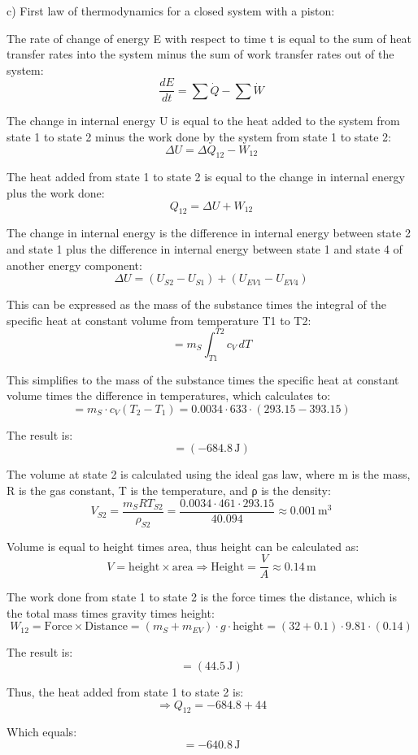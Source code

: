 c) First law of thermodynamics for a closed system with a piston:

The rate of change of energy E with respect to time t is equal to the sum of heat transfer rates into the system minus the sum of work transfer rates out of the system:
\[
\frac{dE}{dt} = \sum \dot{Q} - \sum \dot{W}
\]

The change in internal energy U is equal to the heat added to the system from state 1 to state 2 minus the work done by the system from state 1 to state 2:
\[
\Delta U = \Delta Q_{12} - W_{12}
\]

The heat added from state 1 to state 2 is equal to the change in internal energy plus the work done:
\[
Q_{12} = \Delta U + W_{12}
\]

The change in internal energy is the difference in internal energy between state 2 and state 1 plus the difference in internal energy between state 1 and state 4 of another energy component:
\[
\Delta U = (U_{S2} - U_{S1}) + (U_{EV1} - U_{EV4})
\]

This can be expressed as the mass of the substance times the integral of the specific heat at constant volume from temperature T1 to T2:
\[
= m_S \int_{T1}^{T2} c_V \, dT
\]

This simplifies to the mass of the substance times the specific heat at constant volume times the difference in temperatures, which calculates to:
\[
= m_S \cdot c_V (T_2 - T_1) = 0.0034 \cdot 633 \cdot (293.15 - 393.15)
\]

The result is:
\[
= (-684.8 \, \text{J})
\]

The volume at state 2 is calculated using the ideal gas law, where m is the mass, R is the gas constant, T is the temperature, and ρ is the density:
\[
V_{S2} = \frac{m_S R T_{S2}}{\rho_{S2}} = \frac{0.0034 \cdot 461 \cdot 293.15}{40.094} \approx 0.001 \, \text{m}^3
\]

Volume is equal to height times area, thus height can be calculated as:
\[
V = \text{height} \times \text{area} \Rightarrow \text{Height} = \frac{V}{A} \approx 0.14 \, \text{m}
\]

The work done from state 1 to state 2 is the force times the distance, which is the total mass times gravity times height:
\[
W_{12} = \text{Force} \times \text{Distance} = (m_S + m_{EV}) \cdot g \cdot \text{height} = (32 + 0.1) \cdot 9.81 \cdot (0.14)
\]

The result is:
\[
= (44.5 \, \text{J})
\]

Thus, the heat added from state 1 to state 2 is:
\[
\Rightarrow Q_{12} = -684.8 + 44
\]

Which equals:
\[
= -640.8 \, \text{J}
\]